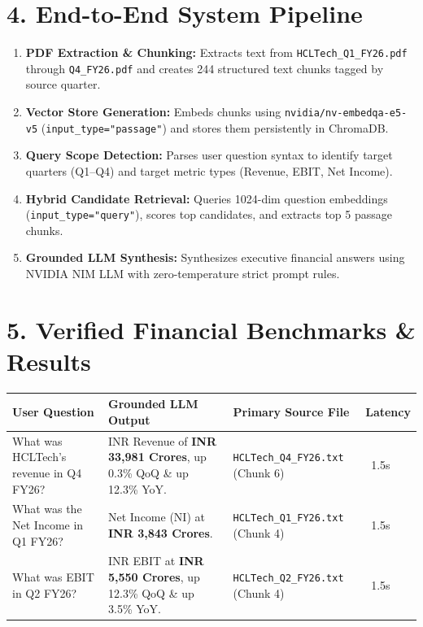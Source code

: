 \documentclass[11pt,a4paper]{article}
\begin{document}
\vspace{0.8em}

\section{4. End-to-End System Pipeline}

\begin{enumerate}[leftmargin=1.5em]
    \item \textbf{PDF Extraction \& Chunking:} Extracts text from \texttt{HCLTech\_Q1\_FY26.pdf} through \texttt{Q4\_FY26.pdf} and creates 244 structured text chunks tagged by source quarter.
    \item \textbf{Vector Store Generation:} Embeds chunks using \texttt{nvidia/nv-embedqa-e5-v5} (\texttt{input\_type="passage"}) and stores them persistently in ChromaDB.
    \item \textbf{Query Scope Detection:} Parses user question syntax to identify target quarters (Q1--Q4) and target metric types (Revenue, EBIT, Net Income).
    \item \textbf{Hybrid Candidate Retrieval:} Queries 1024-dim question embeddings (\texttt{input\_type="query"}), scores top candidates, and extracts top 5 passage chunks.
    \item \textbf{Grounded LLM Synthesis:} Synthesizes executive financial answers using NVIDIA NIM LLM with zero-temperature strict prompt rules.
\end{enumerate}

\vspace{0.8em}

\section{5. Verified Financial Benchmarks \& Results}

\begin{table}[h]
\centering
\small
\begin{tabularx}{\textwidth}{X X l l}
\toprule
\textbf{User Question} & \textbf{Grounded LLM Output} & \textbf{Primary Source File} & \textbf{Latency} \\
\midrule
What was HCLTech's revenue in Q4 FY26? & INR Revenue of \textbf{INR 33,981 Crores}, up 0.3\% QoQ \& up 12.3\% YoY. & \texttt{HCLTech\_Q4\_FY26.txt} (Chunk 6) & ~1.5s \\
What was the Net Income in Q1 FY26? & Net Income (NI) at \textbf{INR 3,843 Crores}. & \texttt{HCLTech\_Q1\_FY26.txt} (Chunk 4) & ~1.5s \\
What was EBIT in Q2 FY26? & INR EBIT at \textbf{INR 5,550 Crores}, up 12.3\% QoQ \& up 3.5\% YoY. & \texttt{HCLTech\_Q2\_FY26.txt} (Chunk 4) & ~1.5s \\
\bottomrule
\end{tabularx}
\end{table}
\end{document}
